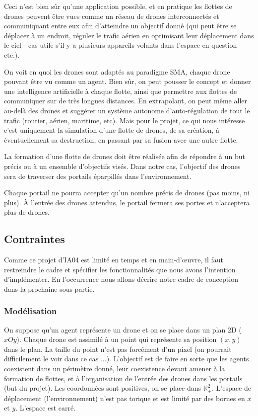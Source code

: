\documentclass[11pt]{report}
\begin{document}
Ceci n'est bien sûr qu'une application possible, et en pratique les flottes de drones peuvent être vues comme un réseau de drones interconnectés et communiquant entre eux afin d'atteindre un objectif donné (qui peut être se déplacer à un endroit, réguler le trafic aérien en optimisant leur déplacement dans le ciel - cas utile s'il y a plusieurs appareils volants dans l'espace en question - etc.).

On voit en quoi les drones sont adaptés au paradigme SMA, chaque drone pouvant être vu comme un agent. Bien sûr, on peut pousser le concept et donner une intelligence artificielle à chaque flotte, ainsi que permettre aux flottes de communiquer sur de très longues distances. En extrapolant, on peut même aller au-delà des drones et suggérer un système autonome d'auto-régulation de tout le trafic (routier, aérien, maritime, etc). Mais pour le projet, ce qui nous intéresse c'est uniquement la simulation d'une flotte de drones, de sa création, à éventuellement sa destruction, en passant par sa fusion avec une autre flotte.

La formation d'une flotte de drones doit être réalisée afin de répondre à un but précis ou à un ensemble d'objectifs visés. Dans notre cas, l'objectif des drones sera de traverser des portails éparpillés dans l'environnement.

Chaque portail ne pourra accepter qu'un nombre précis de drones (pas moins, ni plus). À l'entrée des drones attendus, le portail fermera ses portes et n'acceptera plus de drones.

\subsection{Contraintes}

Comme ce projet d'IA04 est limité en temps et en main-d'œuvre, il faut restreindre le cadre et spécifier les fonctionnalités que nous avons l'intention d'implémenter. En l'occurrence nous allons décrire notre cadre de conception dans la prochaine sous-partie.

\subsubsection{Modélisation} 

On suppose qu'un agent représente un drone et on se place dans un plan 2D ($xOy$). Chaque drone est assimilé à un point qui représente sa position $(x, y)$ dans le plan. La taille du point n'est pas forcément d'un pixel (on pourrait difficilement le voir dans ce cas ...). L'objectif est de faire en sorte que les agents coexistent dans un périmètre donné, leur coexistence devant amener à la formation de flottes, et à l'organisation de l'entrée des drones dans les portails (but du projet). Les coordonnées sont positives, on se place dans $\mathbb{R}^{2}_{+}$. L'espace de déplacement (l'environnement) n'est pas torique et est limité par des bornes en $x$ et $y$. L'espace est carré.
\end{document}
